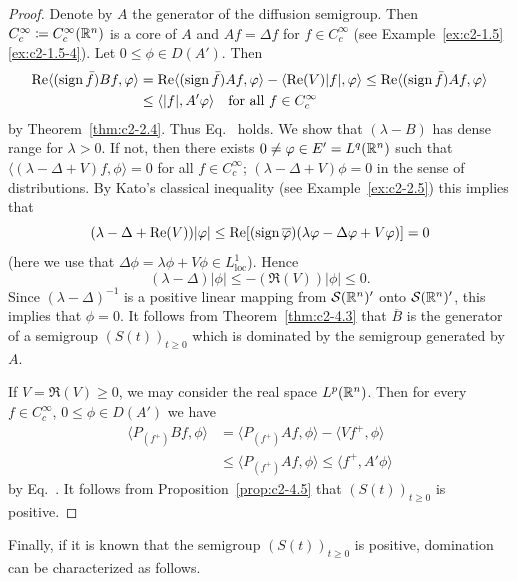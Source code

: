 \begin{proof}
Denote by $A$ the generator of the diffusion semigroup. 
Then $C^{\infty}_{c} \coloneq C^{\infty}_{c}(\mathbb{R}^{n})$ is a core of\/ $A$ and $Af = \Delta f$ for $f \in C^{\infty}_{c}$ (see Example~\ref{ex:c2-1.5}\,\ref{ex:c2-1.5-4}). 
Let $0 \leq \phi \in D(A')$. Then
\begin{align*}
\Re\langle(\sign \bar{f})Bf,\phi\rangle &= \Re\langle(\sign \bar{f})Af,\phi\rangle - \langle\Re(V)|f|,\phi\rangle \leq \Re\langle(\sign \bar{f})Af,\phi\rangle\\
&\leq \langle|f|,A'\phi\rangle \quad \text{for all } f \in C^{\infty}_{c} 
\end{align*}
by Theorem~\ref{thm:c2-2.4}.
Thus Eq.~ holds.
We show that $(\lambda - B)$ has dense range for $\lambda > 0$. 
If not, then there exists $0 \neq \phi \in E' = L^{q}(\R^{n})$ such that $\langle(\lambda - \Delta + V)f,\phi\rangle = 0$ for all $f \in C^{\infty}_{c}$; \ie $(\lambda - \Delta + V)\phi = 0$ in the sense of distributions. 
By Kato's classical inequality (see Example~\ref{ex:c2-2.5}) this implies that
\[
(\lambda - \Delta + \Re(V))|\phi| \leq \Re[(\sign \overline{\phi})(\lambda\phi - \Delta\phi + V\phi)] = 0
\] 
(here we use that $\Delta\phi = \lambda\phi + V\phi \in L^{1}_{\text{loc}}$). 
Hence 
\[
(\lambda - \Delta)|\phi| \leq -(\Re(V))|\phi| \leq 0 .
\]
Since $(\lambda - \Delta)^{-1}$ is a positive linear mapping from $\mathcal{S}(\mathbb{R}^{n})'$ onto $\mathcal{S}(\mathbb{R}^{n})'$, this implies that $\phi = 0$. 
It follows from Theorem~\ref{thm:c2-4.3}   that $\overline{B}$ is the
generator of a semigroup $(S(t))_{t \geq 0}$ which is dominated by the semigroup generated by $A$.

If\/ $V = \Re(V) \geq 0$, we may consider the real space $L^{p}(\mathbb{R}^{n})$. 
Then for every $f \in C^{\infty}_{c}$, $0 \leq \phi \in D(A')$ we have
\begin{align*}
\langle P_{(f^{+})}Bf,\phi\rangle &= \langle P_{(f^{+})}Af,\phi\rangle - \langle Vf^{+},\phi\rangle\\
&\leq \langle P_{(f^{+})}Af,\phi\rangle 
\leq \langle f^{+},A'\phi\rangle
\end{align*}
by Eq.~. 
It follows from  Proposition~\ref{prop:c2-4.5} that $(S(t))_{t \geq 0}$ is positive.
\end{proof}
Finally, if it is known that the semigroup $(S(t))_{t \geq 0}$ is positive,
domination can be characterized as follows.

